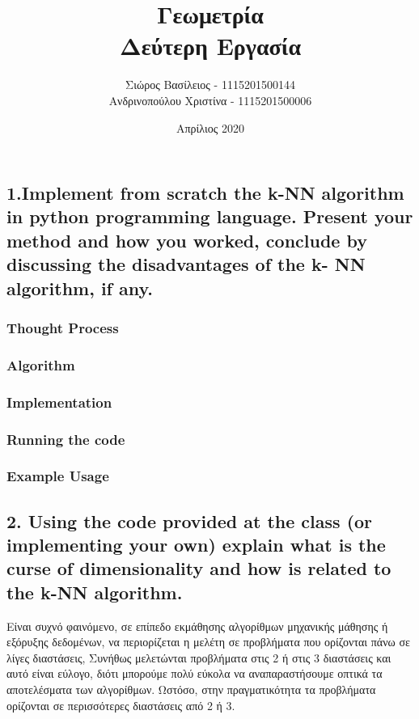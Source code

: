 \documentclass[12pt]{article}
\title{\hugeΥπολογιστική Γεωμετρία\\Δεύτερη Εργασία}
\author{Σιώρος Βασίλειος - 1115201500144\\Ανδρινοπούλου Χριστίνα - 1115201500006}
\date{Απρίλιος 2020}
\begin{document}
\maketitle


\pagebreak


\subsection*{1.Implement from scratch the k-NN algorithm in python programming language.
	Present your method and how you worked, conclude by discussing the disadvantages of the k-
	NN algorithm, if any.}

\subsubsection*{Thought Process}



\subsubsection*{Algorithm}



\subsubsection*{Implementation}


\subsubsection*{Running the code}


\subsubsection*{Example Usage}



\pagebreak

\subsection*{2. Using the code provided at the class (or implementing your own) explain what
	is the curse of dimensionality and how is related to the k-NN algorithm.}

Είναι συχνό φαινόμενο, σε επίπεδο εκμάθησης αλγορίθμων μηχανικής μάθησης ή εξόρυξης δεδομένων, να περιορίζεται η μελέτη σε προβλήματα που ορίζονται πάνω σε λίγες διαστάσεις, Συνήθως μελετώνται προβλήματα στις 2 ή στις 3 διαστάσεις και αυτό είναι εύλογο, διότι μπορούμε πολύ εύκολα να αναπαραστήσουμε οπτικά τα αποτελέσματα των αλγορίθμων. Ωστόσο, στην πραγματικότητα τα προβλήματα ορίζονται σε περισσότερες διαστάσεις από 2 ή 3. \\
\end{document}
